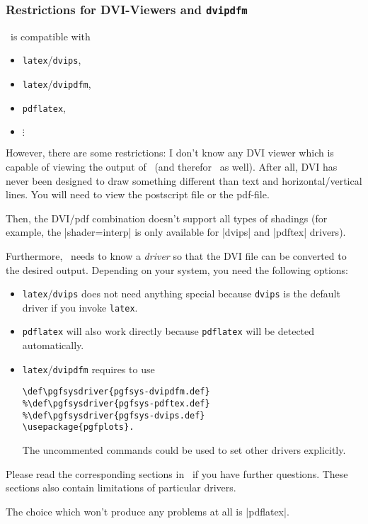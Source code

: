 \subsubsection{Restrictions for DVI-Viewers and \texttt{dvipdfm}}
\label{sec:drivers}%
\PGF\ is compatible with 
\begin{itemize}
	\item \lstinline!latex!/\lstinline!dvips!,
	\item \lstinline!latex!/\lstinline!dvipdfm!,
	\item \lstinline!pdflatex!,
	\item $\vdots$
\end{itemize}
However, there are some restrictions: I don't know any DVI viewer which is capable of viewing the output of \PGF\ (and therefor \PGFPlots\ as well). After all, DVI has never been designed to draw something different than text and horizontal/vertical lines. You will need to view the postscript file or the pdf-file. 

Then, the DVI/pdf combination doesn't support all types of shadings (for example, the |shader=interp| is only available for |dvips| and |pdftex| drivers).

Furthermore, \PGF\ needs to know a \emph{driver} so that the DVI file can be converted to the desired output. Depending on your system, you need the following options:
\begin{itemize}
	\item \lstinline!latex!/\lstinline!dvips! does not need anything special because \lstinline!dvips! is the default driver if you invoke \lstinline!latex!.
	\item \lstinline!pdflatex! will also work directly because \lstinline!pdflatex! will be detected automatically.
	\item \lstinline!latex!/\lstinline!dvipdfm! requires to use
\begin{verbatim}
\def\pgfsysdriver{pgfsys-dvipdfm.def}
%\def\pgfsysdriver{pgfsys-pdftex.def}
%\def\pgfsysdriver{pgfsys-dvips.def}
\usepackage{pgfplots}.
\end{verbatim}
	The uncommented commands could be used to set other drivers explicitly.
\end{itemize}
Please read the corresponding sections in~\cite[Section 7.2.1 and 7.2.2]{tikz} if you have further questions. These sections also contain limitations of particular drivers.

The choice which won't produce any problems at all is |pdflatex|.

